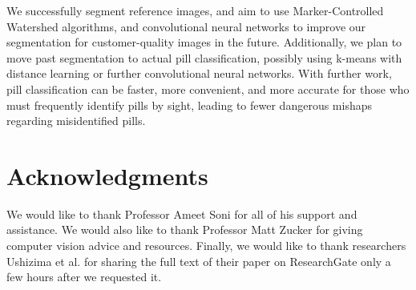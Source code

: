 \documentclass{article}
\begin{document}
We successfully segment reference images, and aim to use Marker-Controlled Watershed algorithms, and convolutional neural networks to improve our segmentation for customer-quality images in the future. Additionally, we plan to move past segmentation to actual pill classification, possibly using k-means with distance learning or further convolutional neural networks. With further work, pill classification can be faster, more convenient, and more accurate for those who must frequently identify pills by sight, leading to fewer dangerous mishaps regarding misidentified pills.

\section*{Acknowledgments}

We would like to thank Professor Ameet Soni for all of his support and assistance. We would also like to thank Professor Matt Zucker for giving computer vision advice and resources. Finally, we would like to thank researchers Ushizima et al. for sharing the full text of their paper on ResearchGate only a few hours after we requested it.


\nocite{ushizima}
\nocite{PIR}



\end{document}
